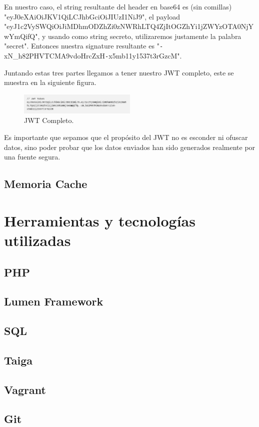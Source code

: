 \begin{itemize}
	En nuestro caso, el string resultante del header en base64 es (sin comillas) 
	"eyJ0eXAiOiJKV1QiLCJhbGciOiJIUzI1NiJ9", el payload 
	"eyJ1c2VySWQiOiJiMDhmODZhZi0zNWRhLTQ4ZjItOGZhYi1jZWYzOTA0NjYwYmQifQ", y usando como 
	string secreto, utilizaremos justamente la palabra "secret". Entonces nuestra signature 
	resultante es "\texttt{-}xN\_h82PHVTCMA9vdoHrcZxH\texttt{-}x5mb11y1537t3rGzcM".
	
	Juntando estas tres partes llegamos a tener nuestro JWT completo, este se muestra en 
	la siguiente figura.
	
	\begin{figure}[H] 
		\centering    
		\includegraphics[width=0.5\textwidth]{jwt4}
		\caption[JWT Complete]{JWT Completo.}
		\label{fig:jwt-complete}
	\end{figure}
	
\end{itemize}

Es importante que sepamos que el propósito del JWT no es esconder ni ofuscar datos, sino 
poder probar que los datos enviados han sido generados realmente por una fuente segura.

\subsection{Memoria Cache}


\section{Herramientas y tecnologías utilizadas}

\subsection{PHP}

\subsection{Lumen Framework}

\subsection{SQL}

\subsection{Taiga}

\subsection{Vagrant}

\subsection{Git}